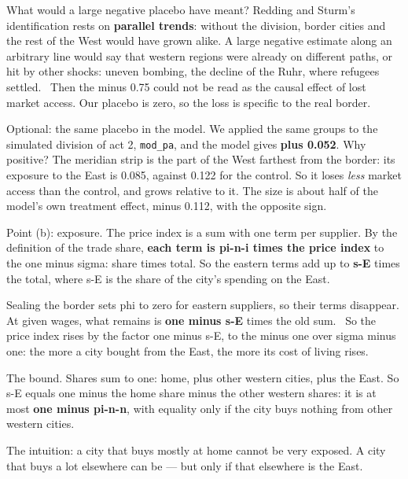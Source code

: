 \begin{say}
 What would a large negative placebo have meant? Redding and Sturm's identification rests on \textbf{parallel trends}: without the division, border cities and the rest of the West would have grown alike. A large negative estimate along an arbitrary line would say that western regions were already on different paths, or hit by other shocks: uneven bombing, the decline of the Ruhr, where refugees settled. \pause\ Then the minus 0.75 could not be read as the causal effect of lost market access. Our placebo is zero, so the loss is specific to the real border.

 Optional: the same placebo in the model. We applied the same groups to the simulated division of act 2, \texttt{mod\_pa}, and the model gives \textbf{plus 0.052}. Why positive? The meridian strip is the part of the West farthest from the border: its exposure to the East is 0.085, against 0.122 for the control. So it loses \emph{less} market access than the control, and grows relative to it. The size is about half of the model's own treatment effect, minus 0.112, with the opposite sign.
\end{say}

\begin{say}
 Point (b): exposure. The price index is a sum with one term per supplier. By the definition of the trade share, \textbf{each term is pi-n-i times the price index} to the one minus sigma: share times total. So the eastern terms add up to \textbf{s-E} times the total, where s-E is the share of the city's spending on the East.

 Sealing the border sets phi to zero for eastern suppliers, so their terms disappear. At given wages, what remains is \textbf{one minus s-E} times the old sum. \pause\ So the price index rises by the factor one minus s-E, to the minus one over sigma minus one: the more a city bought from the East, the more its cost of living rises.

 The bound. Shares sum to one: home, plus other western cities, plus the East. So s-E equals one minus the home share minus the other western shares: it is at most \textbf{one minus pi-n-n}, with equality only if the city buys nothing from other western cities.

 The intuition: a city that buys mostly at home cannot be very exposed. A city that buys a lot elsewhere can be --- but only if that elsewhere is the East.
\end{say}

